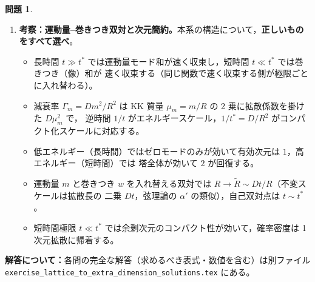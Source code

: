 \documentclass[dvipdfmx, uplatex]{jsarticle}
\theoremstyle{definition}
\newtheorem*{prob}{問題}
\begin{document}
\begin{prob}
\begin{enumerate}[start=17]
\item \textbf{考察：運動量--巻きつき双対と次元簡約。}本系の構造について，\textbf{正しいものをすべて選べ}。
\begin{itemize}\setlength{\itemsep}{1pt}
\item[(あ)] 長時間 $t\gg t^\ast$ では運動量モード和が速く収束し，短時間 $t\ll t^\ast$ では巻きつき（像）和が
速く収束する（同じ関数で速く収束する側が極限ごとに入れ替わる）。
\item[(い)] 減衰率 $\Gamma_m=Dm^2/R^2$ は KK 質量 $\mu_m=m/R$ の 2 乗に拡散係数を掛けた $D\mu_m^2$ で，
逆時間 $1/t$ がエネルギースケール，$1/t^\ast=D/R^2$ がコンパクト化スケールに対応する。
\item[(う)] 低エネルギー（長時間）ではゼロモードのみが効いて有効次元は $1$，高エネルギー（短時間）では
塔全体が効いて $2$ が回復する。
\item[(え)] 運動量 $m$ と巻きつき $w$ を入れ替える双対では $R\to\tilde R\sim Dt/R$（不変スケールは拡散長の
二乗 $Dt$，弦理論の $\alpha'$ の類似），自己双対点は $t\sim t^\ast$。
\item[(お)] 短時間極限 $t\ll t^\ast$ では余剰次元のコンパクト性が効いて，確率密度は 1 次元拡散に帰着する。
\end{itemize}
\end{enumerate}
\end{prob}

\bigskip
{\sloppy
\noindent\textbf{解答について：}各問の完全な解答（求めるべき表式・数値を含む）は別ファイル
\texttt{exercise\_lattice\_to\_extra\_dimension\_solutions.tex} にある。
\par}
\end{document}
